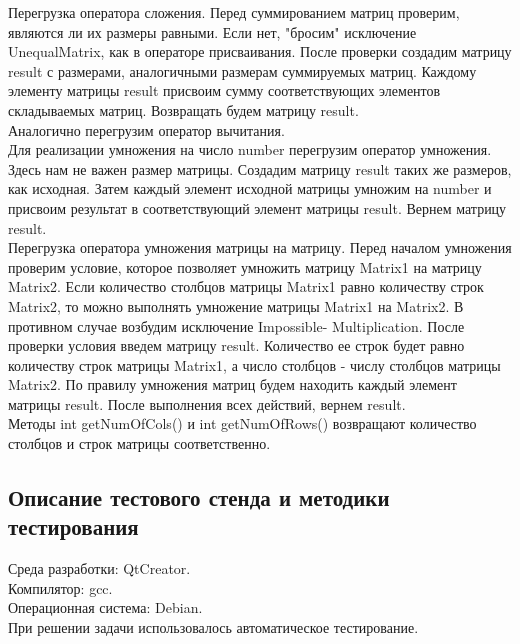 \documentclass[12pt,a4paper]{report}
\begin{document}
Перегрузка оператора сложения. Перед суммированием матриц проверим, являются ли их размеры равными. Если нет, "бросим" исключение UnequalMatrix, как в операторе присваивания. После проверки создадим матрицу result с размерами, аналогичными размерам суммируемых матриц. Каждому элементу матрицы result присвоим сумму соответствующих элементов складываемых матриц. Возвращать будем матрицу result. \\
Аналогично перегрузим оператор вычитания. \\
Для реализации умножения на число number перегрузим оператор умножения. Здесь нам не важен размер матрицы. Создадим матрицу result таких же размеров, как исходная. Затем каждый элемент исходной матрицы умножим на number и присвоим результат в соответствующий элемент матрицы result. Вернем матрицу result. \\
Перегрузка оператора умножения матрицы на матрицу. Перед началом умножения проверим условие, которое позволяет умножить матрицу Matrix1 на матрицу Matrix2. Если количество столбцов матрицы Matrix1 равно количеству строк Matrix2, то можно выполнять умножение матрицы Matrix1 на Matrix2. В противном случае возбудим исключение Impossible- Multiplication. После проверки условия введем матрицу result. Количество ее строк будет равно количеству строк матрицы Matrix1, а число столбцов - числу столбцов матрицы Matrix2. По правилу умножения матриц будем находить каждый элемент матрицы result. После выполнения всех действий, вернем result. \\
Методы int getNumOfCols() и int getNumOfRows() возвращают количество столбцов и строк матрицы соответственно. 
\subsection{Описание тестового стенда и методики тестирования}
Среда разработки: QtCreator.\\
Компилятор: gcc. \\
Операционная система: Debian. \\
При решении задачи использовалось автоматическое тестирование. 
\end{document}
